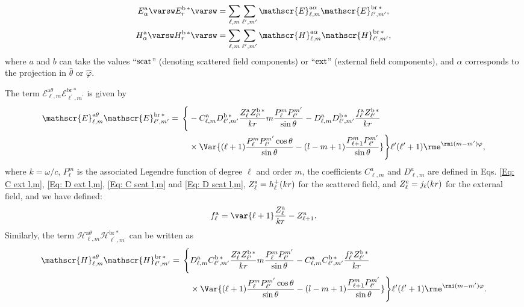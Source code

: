 %
\begin{align}
E^{\rm a}_{\alpha}\varsw E_{r}^{\rm b \,*}\varsw &= \sum_{\ell, m} \sum_{\ell^{\prime}, m^{\prime}} \mathscr{E}_{\ell, m}^{\text{a}\alpha}\mathscr{E}_{\ell^{\prime}, m^{\prime}}^{\text{br}\,*},\label{eq: cross terms E field}\\
H^{\rm a}_{\alpha}\varsw H_{r}^{\rm b \,*}\varsw &= \sum_{\ell, m} \sum_{\ell^{\prime}, m^{\prime}} \mathscr{H}_{\ell, m}^{\text{a}\alpha}\mathscr{H}_{\ell^{\prime}, m^{\prime}}^{\text{br}\,*},\label{eq: cross terms H field}
\end{align}
where $a$ and $b$ can take the values ``$\rm scat$'' (denoting scattered field components) or ``$\rm ext$'' (external field components), and $\alpha$ corresponds to the projection in $\hat{\theta}$ or $\hat{\varphi}$.

The term $\mathscr{E}_{\ell, m}^{\text{a}\theta}\mathscr{E}_{\ell^{\prime}, m^{\prime}}^{\text{br}\,*}$ is given by
%
\begin{align}
\mathscr{E}_{\ell, m}^{\text{a}\theta}\mathscr{E}_{\ell^{\prime}, m^{\prime}}^{\text{br}\,*}= \, \Bigg\{&-C_{\ell,m}^{\rm a}D_{\ell^{\prime}, m^{\prime}}^{\rm b \, *}\frac{Z_{\ell}^{\rm a}Z_{\ell^{\prime}}^{\rm b\, *}}{k r} m \frac{P_{\ell}^{m}P_{\ell^{\prime}}^{m^{\prime}}}{\sin\theta}-D_{\ell, m}^{\rm a}D_{\ell^{\prime}, m^{\prime}}^{\rm b \, *} \frac{f_{\ell}^{\rm a}Z_{\ell^{\prime}}^{\rm b \, *}}{k r}\nonumber\\
& \times \Var{(\ell+1) \frac{P_{\ell}^m P_{\ell^{\prime}}^{m^{\prime}}\cos\theta}{\sin\theta}-(l-m+1)\frac{P_{\ell+1}^{m}P_{\ell^{\prime}}^{m^{\prime}}}{\sin\theta}}\Bigg\}\ell^{\prime}(\ell^{\prime}+1)  \rme^{\rmi (m-m^{\prime})\varphi },
\end{align}
%
where $k=\omega/c$, $P_{\ell}^{m}$ is the associated Legendre function of degree $\ell$ and order $m$, the coefficients $C_{\ell, m}^{a}$ and $D_{\ell, m}^{a}$ are defined in Eqs. \eqref{Eq: C ext l,m}, \eqref{Eq: D ext l,m}, \eqref{Eq: C scat l,m} and \eqref{Eq: D scat l,m}, $Z_{\ell}^{\rm s}=h_{\ell}^{+}(k r)$ for the scattered field, and $Z_{\ell}^{\rm e}=j_{\ell}(k r)$ for the external field, and we have defined:
%
\begin{equation}
f_{\ell}^{\rm a}= \var{\ell + 1} \frac{Z_{\ell}^{\rm a}}{k r}-Z_{\ell+1}^{\rm a}.
\end{equation}
%
Similarly, the term $\mathscr{H}_{\ell, m}^{\text{a}\theta}\mathscr{H}_{\ell^{\prime}, m^{\prime}}^{\text{br}\,*}$ can be written as
%
\begin{align}
\mathscr{H}_{\ell, m}^{\text{a}\theta}\mathscr{H}_{\ell^{\prime}, m^{\prime}}^{\text{br}\,*}= \, \Bigg\{& D_{\ell,m}^{\rm a}C_{\ell^{\prime}, m^{\prime}}^{\rm b \, *}\frac{Z_{\ell}^{\rm a}Z_{\ell^{\prime}}^{\rm b\, *}}{k r} m \frac{P_{\ell}^{m}P_{\ell^{\prime}}^{m^{\prime}}}{\sin\theta}-C_{\ell, m}^{\rm a}C_{\ell^{\prime}, m^{\prime}}^{\rm b \, *} \frac{f_{\ell}^{\rm a}Z_{\ell^{\prime}}^{\rm b \, *}}{k r}\nonumber\\
& \times \Var{(\ell+1) \frac{P_{\ell}^m P_{\ell^{\prime}}^{m^{\prime}}\cos\theta}{\sin\theta}-(l-m+1)\frac{P_{\ell+1}^{m}P_{\ell^{\prime}}^{m^{\prime}}}{\sin\theta}}\Bigg\}\ell^{\prime}(\ell^{\prime}+1)  \rme^{\rmi (m-m^{\prime})\varphi }.
\end{align}
